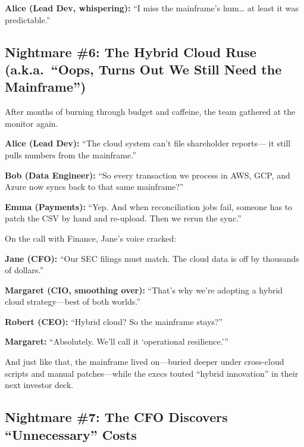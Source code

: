 \medskip

\textbf{Alice (Lead Dev, whispering):} “I miss the mainframe’s hum… at least it  
was predictable.”


\subsection{Nightmare \#6: The Hybrid Cloud Ruse (a.k.a.\ “Oops, Turns Out We Still Need the Mainframe”)}

After months of burning through budget and caffeine, the team gathered at the  
monitor again.

\medskip

\textbf{Alice (Lead Dev):} “The cloud system can’t file shareholder reports—  
it still pulls numbers from the mainframe.”

\medskip

\textbf{Bob (Data Engineer):} “So every transaction we process in AWS, GCP,  
and Azure now syncs back to that same mainframe?”

\medskip

\textbf{Emma (Payments):} “Yep. And when reconciliation jobs fail, someone  
has to patch the CSV by hand and re-upload. Then we rerun the sync.”

\medskip

On the call with Finance, Jane’s voice cracked:

\medskip

\textbf{Jane (CFO):} “Our SEC filings must match. The cloud data is off by  
thousands of dollars.”

\medskip

\textbf{Margaret (CIO, smoothing over):} “That’s why we’re adopting a hybrid  
cloud strategy—best of both worlds.”

\medskip

\textbf{Robert (CEO):} “Hybrid cloud? So the mainframe stays?”

\medskip

\textbf{Margaret:} “Absolutely. We’ll call it ‘operational resilience.’”

\medskip

And just like that, the mainframe lived on—buried deeper under cross-cloud  
scripts and manual patches—while the execs touted “hybrid innovation” in  
their next investor deck.  

\subsection{Nightmare \#7: The CFO Discovers “Unnecessary” Costs}

